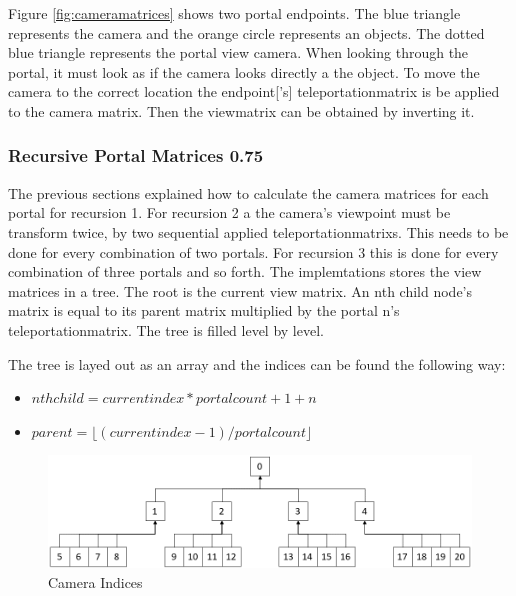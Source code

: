 Figure \ref{fig:cameramatrices} shows two portal endpoints. The blue triangle represents the camera and the orange circle represents an objects. The dotted blue triangle represents the portal view camera.
When looking through the portal, it must look as if the camera looks directly a the object. To move the camera to the correct location the \gls{endpoint}['s] \gls{teleportationmatrix} is be applied to the camera matrix. Then the  \gls{viewmatrix} can be obtained by inverting it.


\subsubsection{Recursive Portal Matrices 0.75}
\label{section:recursivecameramatrices}
The previous sections explained how to calculate the camera matrices for each portal for recursion 1. For recursion 2 a the camera's viewpoint must be transform twice, by two sequential applied \glspl{teleportationmatrix}. This needs to be done for every combination of two portals. For recursion 3 this is done for every combination of three portals and so forth. The implemtations stores the view matrices in a tree. The root is the current view matrix. An nth child node's matrix is equal to its parent matrix multiplied by the portal n's \gls{teleportationmatrix}. The tree is filled level by level.


The tree is layed out as an array and the indices can be found the following way:

\begin{itemize}
	\item $ nth child = current index * portalcount + 1 + n$
	\item $ parent = \lfloor(current index-1)/portal count\rfloor $
\end{itemize}




\begin{figure}[h]
	\includegraphics[width=\linewidth]{images/cameraindices.png}
	\caption{Camera Indices}
	\label{fig:cameraindices}
\end{figure}

